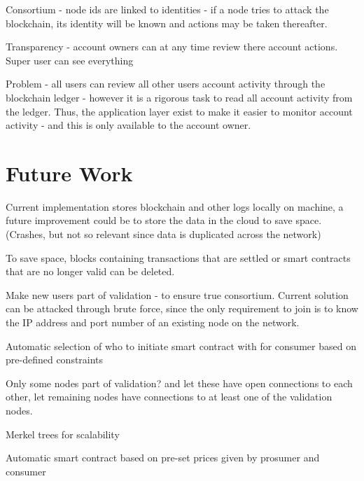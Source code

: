 Consortium - node ids are linked to identities - if a node tries to attack the blockchain, its identity will be known and actions may be taken thereafter. 

Transparency - account owners can at any time review there account actions. Super user can see everything

Problem - all users can review all other users account activity through the blockchain ledger - however it is a rigorous task to read all account activity from the ledger. Thus, the application layer exist to make it easier to monitor account activity - and this is only available to the account owner. 

\section{Future Work}
Current implementation stores blockchain and other logs locally on machine, a future improvement could be to store the data in the cloud to save space. (Crashes, but not so relevant since data is duplicated across the network)

To save space, blocks containing transactions that are settled or smart contracts that are no longer valid can be deleted. 

Make new users part of validation - to ensure true consortium. Current solution can be attacked through brute force, since the only requirement to join is to know the IP address and port number of an existing node on the network.

Automatic selection of who to initiate smart contract with for consumer based on pre-defined constraints 

Only some nodes part of validation? and let these have open connections to each other, let remaining nodes have connections to at least one of the validation nodes. 

Merkel trees for scalability

Automatic smart contract based on pre-set prices given by prosumer and consumer